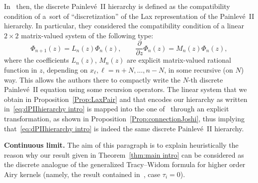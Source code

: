 \documentclass[pdftex]{sigma}%
\numberwithin{equation}{section}
\begin{document}
In~\cite{joshi1999discrete} then, the discrete Painlev\'e~II hierarchy is defined as the compatibility condition of a~sort of ``discretization'' of the Lax representation of the Painlev\'e~II hierarchy. In particular, they considered the compatibility condition of a linear $2\times 2$ matrix-valued system of the following type:
\begin{equation}\label{eq:lin sys intro}
\Phi_{n+1}(z) = L_n(z) \Phi_n(z), \qquad
\frac{\partial}{\partial z}\Phi_{n}(z) = M_n(z) \Phi_n(z),
\end{equation}
where the coefficients $L_n(z)$, $M_n(z)$ are explicit matrix-valued rational function in $z$, depending on $x_\ell,\ell=n+N,\dots, n-N$, in some recursive (on $N$) way. This allows the authors there to compactly write the $N$-th discrete Painlev\'e~II equation using some recursion operators.
The linear system that we obtain in Proposition~\ref{Prop:LaxPair} and that encodes our hierarchy as written in~\eqref{eq:dPIIhierarchy intro} is mapped into the one of~\cite{joshi1999discrete} through an explicit transformation, as shown in Proposition~\ref{Prop:connectionJoshi}, thus implying that~\eqref{eq:dPIIhierarchy intro} is indeed the same discrete Painlev\'e~II hierarchy.

{\bf Continuous limit.}
The aim of this paragraph is to explain heuristically the reason why our result given in Theorem~\ref{thm:main intro} can be considered as the discrete analogue of the generalized Tracy--Widom formula for higher order Airy kernels (namely, the result contained in~\cite[Theorem~1.1]{CafassoClaeysGirotti}, case $\tau_i=0$).
\end{document}
